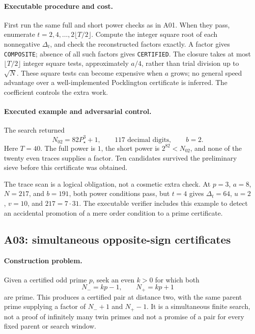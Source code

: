\documentclass[11pt,a4paper]{article}
\theoremstyle{definition}\newtheorem{definition}[theorem]{Definition}
\theoremstyle{remark}\newtheorem{remark}[theorem]{Remark}
\begin{document}
\paragraph{Executable procedure and cost.}
First run the same full and short power checks as in A01. When they pass,
enumerate $t=2,4,\ldots,2\lfloor T/2\rfloor$. Compute the integer square
root of each nonnegative $\Delta_t$, and check the reconstructed factors
exactly. A factor gives \texttt{COMPOSITE}; absence of all such factors
gives \texttt{CERTIFIED}. The closure takes at most $\lfloor T/2\rfloor$
integer square tests, approximately $a/4$, rather than trial division up
to $\sqrt N$. These square tests can become expensive when $a$ grows;
no general speed advantage over a well-implemented Pocklington certificate
is inferred. The coefficient controls the extra work.

\paragraph{Executed example and adversarial control.}
The search returned
\begin{equation}\label{eq:a02-example}
 N_{02}=82P_\star^3+1,
 \qquad \text{117 decimal digits},\qquad b=2.
\end{equation}
Here $T=40$. The full power is $1$, the short power is $2^{82}<N_{02}$,
and none of the twenty even traces supplies a factor. Ten candidates
survived the preliminary sieve before this certificate was obtained.

The trace scan is a logical obligation, not a cosmetic extra check. At
$p=3$, $a=8$, $N=217$, and $b=191$, both power conditions pass, but
$t=4$ gives $\Delta_t=64$, $u=2$, $v=10$, and
$217=7\cdot31$. The executable verifier includes this example to detect
an accidental promotion of a mere order condition to a prime certificate.

\subsection{A03: simultaneous opposite-sign certificates}
\label{sec:a03}

\paragraph{Construction problem.}
Given a certified odd prime $p$, seek an even $k>0$ for which both
\[
 N_-=kp-1,\qquad N_+=kp+1
\]
are prime. This produces a certified pair at distance two, with the same
parent prime supplying a factor of $N_-+1$ and $N_+-1$.
It is a simultaneous finite search, not a proof of infinitely many twin
primes and not a promise of a pair for every fixed parent or search window.
\end{document}
